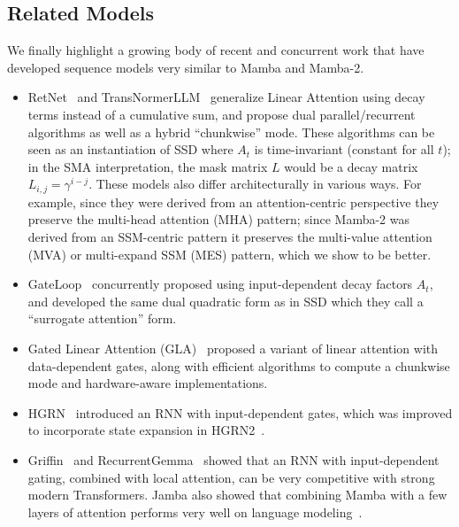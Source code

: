 \subsection{Related Models}
\label{sec:related:concurrent}

We finally highlight a growing body of recent and concurrent work that have developed sequence models very similar to Mamba and Mamba-2.

\begin{itemize}[leftmargin=*,itemsep=0pt,topsep=0pt]
  \item RetNet~\citep{sun2023retentive} and TransNormerLLM~\citep{qin2023transnormerllm} generalize Linear Attention using decay terms instead of a cumulative sum,
    and propose dual parallel/recurrent algorithms as well as a hybrid ``chunkwise'' mode.
    These algorithms can be seen as an instantiation of SSD where $A_t$ is time-invariant (constant for all $t$);
    in the SMA interpretation, the mask matrix $L$ would be a decay matrix $L_{i,j} = \gamma^{i-j}$.
    These models also differ architecturally in various ways.
    For example, since they were derived from an attention-centric perspective they preserve the multi-head attention (MHA) pattern; since Mamba-2 was derived from an SSM-centric pattern it preserves the multi-value attention (MVA) or multi-expand SSM (MES) pattern, which we show to be better\iftoggle{arxiv}{ (\cref{sec:experiments:ablations})}{}.

  \item GateLoop~\citep{katsch2023gateloop} concurrently proposed using input-dependent decay factors $A_t$, and developed the same dual quadratic form as in SSD which they call a ``surrogate attention'' form.

  \item Gated Linear Attention (GLA)~\citep{yang2024gated} proposed a variant of linear attention with data-dependent gates, along with efficient algorithms to compute a chunkwise mode and hardware-aware implementations.

  \item HGRN~\citep{qin2023hierarchically} introduced an RNN with input-dependent gates, which was improved to incorporate state expansion in HGRN2~\citep{qin2024hgrn2}.

  \item Griffin~\citep{de2024griffin} and RecurrentGemma~\citep{botev2024recurrentgemma} showed that an RNN with input-dependent gating, combined with local attention, can be very competitive with strong modern Transformers.
    Jamba also showed that combining Mamba with a few layers of attention performs very well on language modeling~\citep{lieber2024jamba}.


\end{itemize}
